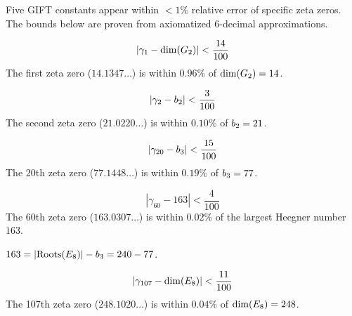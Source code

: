 Five GIFT constants appear within $< 1\%$ relative error of specific zeta zeros.
The bounds below are proven from axiomatized 6-decimal approximations.

\begin{theorem}\label{thm:gamma1_G2}
    \leanok
    \[
        |\gamma_1 - \mathrm{dim}(G_2)| < \frac{14}{100}
    \]
    The first zeta zero ($14.1347\ldots$) is within $0.96\%$ of
    $\mathrm{dim}(G_2) = 14$.
\end{theorem}

\begin{theorem}\label{thm:gamma2_b2}
    \leanok
    \[
        |\gamma_2 - b_2| < \frac{3}{100}
    \]
    The second zeta zero ($21.0220\ldots$) is within $0.10\%$ of $b_2 = 21$.
\end{theorem}

\begin{theorem}\label{thm:gamma20_b3}
    \leanok
    \[
        |\gamma_{20} - b_3| < \frac{15}{100}
    \]
    The 20th zeta zero ($77.1448\ldots$) is within $0.19\%$ of $b_3 = 77$.
\end{theorem}

\begin{theorem}\label{thm:gamma60_163}
    \leanok
    \[
        |\gamma_{60} - 163| < \frac{4}{100}
    \]
    The 60th zeta zero ($163.0307\ldots$) is within $0.02\%$ of the
    largest Heegner number $163$.
\end{theorem}

\begin{theorem}\label{thm:heegner_163_E8}
    \leanok
    $163 = |\mathrm{Roots}(E_8)| - b_3 = 240 - 77$.
\end{theorem}

\begin{theorem}\label{thm:gamma107_E8}
    \leanok
    \[
        |\gamma_{107} - \mathrm{dim}(E_8)| < \frac{11}{100}
    \]
    The 107th zeta zero ($248.1020\ldots$) is within $0.04\%$ of
    $\mathrm{dim}(E_8) = 248$.
\end{theorem}

